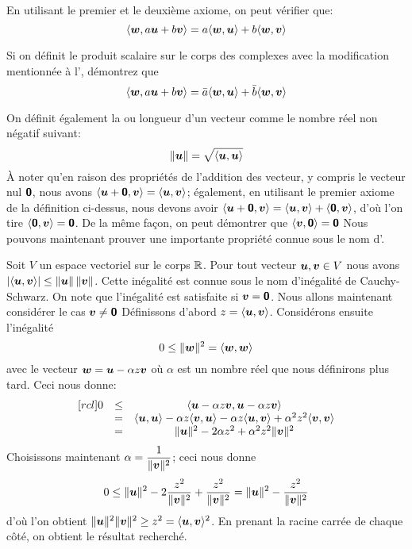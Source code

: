 En utilisant le premier et le deuxième axiome, on peut vérifier que:
\[
\langle \boldsymbol{w}, a\boldsymbol{u} + b\boldsymbol{v} \rangle =  a \langle\boldsymbol{w}, \boldsymbol{u}\rangle 
+ b \langle\boldsymbol{w}, \boldsymbol{v}\rangle
\]

\begin{exerciceB}
Si on définit le produit scalaire sur le corps des complexes avec la modification mentionnée à
 l', démontrez que 
 \[
 \langle \boldsymbol{w}, a\boldsymbol{u} + b\boldsymbol{v} \rangle =  \bar{a} \langle\boldsymbol{w}, \boldsymbol{u}\rangle + \bar{b}\langle\boldsymbol{w}, \boldsymbol{v}\rangle
 \]
\end{exerciceB}

On définit également la  ou longueur d'un vecteur comme le nombre réel non négatif suivant:
\[
\lVert\boldsymbol{u}\rVert = \sqrt{\langle\boldsymbol{u}, \boldsymbol{u} \rangle}
\]
À noter qu'en raison des propriétés de l'addition des vecteur, y compris le vecteur nul $\mbox{\textsf{\textbf{{0}}}}$, nous avons $\langle\boldsymbol{u} + \mbox{\textsf{\textbf{{0}}}}, \boldsymbol{v}\rangle = \langle\boldsymbol{u}, \boldsymbol{v}\rangle $; également, en utilisant le premier axiome de la définition ci-dessus, nous devons avoir
$\langle\boldsymbol{u} + \mbox{\textsf{\textbf{{0}}}}, \boldsymbol{v}\rangle = \langle\boldsymbol{u}, \boldsymbol{v}\rangle +  \langle\mbox{\textsf{\textbf{{0}}}}, \boldsymbol{v}\rangle$, d'où l'on tire 
$ \langle\mbox{\textsf{\textbf{{0}}}}, \boldsymbol{v}\rangle = \mbox{\textsf{\textbf{{0}}}}$.  De la même façon, on peut démontrer que $ \langle\boldsymbol{v}, \mbox{\textsf{\textbf{{0}}}}\rangle = \mbox{\textsf{\textbf{{0}}}}$
Nous pouvons maintenant prouver une importante propriété connue sous le nom 
d'.
\begin{theo}
Soit $V$ un espace vectoriel sur le corps $\mathbb{R}$.
Pour tout vecteur $\boldsymbol{u}, \boldsymbol{v} \in V$ nous avons $ \lvert\langle\boldsymbol{u}, \boldsymbol{v}\rangle\rvert \leq \lVert\boldsymbol{u}\rVert \, \lVert\boldsymbol{v}\rVert$.
Cette inégalité est connue sous le nom d'inégalité de Cauchy-Schwarz.
\proof 
On note que l'inégalité est satisfaite si $\boldsymbol{v}=\mbox{\textsf{\textbf{{0}}}}$. Nous allons maintenant considérer le cas $\boldsymbol{v}\neq\mbox{\textsf{\textbf{{0}}}}$
Définissons d'abord $z = \langle\boldsymbol{u}, \boldsymbol{v}\rangle$. 
Considérons ensuite l'inégalité
\[
0 \leq\lVert\boldsymbol{w}\rVert^2 = \langle \boldsymbol{w}, \boldsymbol{w}\rangle
\]
avec le vecteur $\boldsymbol{w} = \boldsymbol{u} - \alpha z \boldsymbol{v}$ où $\alpha$ est un nombre réel que nous définirons plus tard.
Ceci nous donne:
\[
\begin{matrix}[rcl]
0 &\leq& \langle \boldsymbol{u} - \alpha z \boldsymbol{v},  \boldsymbol{u} - \alpha z \boldsymbol{v} \rangle \\
 &=& \langle \boldsymbol{u}, \boldsymbol{u} \rangle - \alpha z  \langle \boldsymbol{v}, \boldsymbol{u} \rangle - \alpha z \langle \boldsymbol{u}, \boldsymbol{v} \rangle + \alpha^2 z^2 
 \langle \boldsymbol{v}, \boldsymbol{v} \rangle \\
 &=& \lVert\boldsymbol{u}\rVert^2 -2\alpha z^2 + \alpha^2 z^2   \lVert\boldsymbol{v}\rVert^2
  \end{matrix}
\]
Choisissons maintenant $\displaystyle \alpha = \frac{1}{\lVert\boldsymbol{v}\rVert^2}$; ceci nous donne
\[
0 \leq  \lVert\boldsymbol{u}\rVert^2 - 2 \frac{z^2}{\lVert\boldsymbol{v}\rVert^2} + \frac{z^2}{\lVert\boldsymbol{v}\rVert^2} =  \lVert\boldsymbol{u}\rVert^2 -  \frac{z^2}{\lVert\boldsymbol{v}\rVert^2} 
\]
d'où l'on obtient $  \lVert\boldsymbol{u}\rVert^2 \lVert\boldsymbol{v}\rVert^2 \geq  z^2 =  \langle\boldsymbol{u}, \boldsymbol{v}\rangle^2$.  En prenant la
racine carrée de chaque côté, on obtient le résultat recherché. 
\end{theo}
